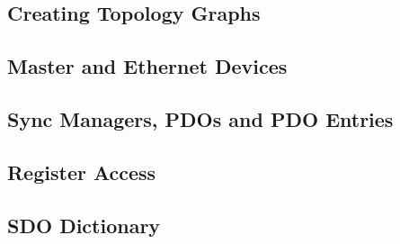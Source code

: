 \documentclass[a4paper,12pt,BCOR6mm,bibtotoc,idxtotoc]{scrbook}
\begin{document}

\subsection{Creating Topology Graphs}




\subsection{Master and Ethernet Devices}




\subsection{Sync Managers, PDOs and PDO Entries}




\subsection{Register Access}
\label{sec:regaccess}






\subsection{SDO Dictionary}



\end{document}
